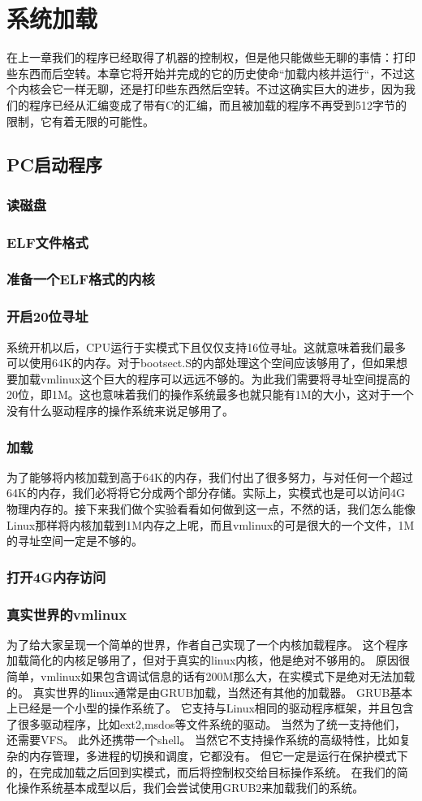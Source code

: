 \chapter{系统加载}

在上一章我们的程序已经取得了机器的控制权，但是他只能做些无聊的事情：打印些东西而后空转。本章它将开始并完成的它的历史使命“加载内核并运行“，不过这个内核会它一样无聊，还是打印些东西然后空转。不过这确实巨大的进步，因为我们的程序已经从汇编变成了带有C的汇编，而且被加载的程序不再受到512字节的限制，它有着无限的可能性。
\section{PC启动程序}
\subsection{读磁盘}
\subsection{ELF文件格式}
\subsection{准备一个ELF格式的内核}
\subsection{开启20位寻址}
系统开机以后，CPU运行于实模式下且仅仅支持16位寻址。这就意味着我们最多可以使用64K的内存。对于bootsect.S的内部处理这个空间应该够用了，但如果想要加载vmlinux这个巨大的程序可以远远不够的。为此我们需要将寻址空间提高的20位，即1M。这也意味着我们的操作系统最多也就只能有1M的大小，这对于一个没有什么驱动程序的操作系统来说足够用了。
\subsection{加载}
为了能够将内核加载到高于64K的内存，我们付出了很多努力，与对任何一个超过64K的内存，我们必将将它分成两个部分存储。实际上，实模式也是可以访问4G物理内存的。接下来我们做个实验看看如何做到这一点，不然的话，我们怎么能像Linux那样将内核加载到1M内存之上呢，而且vmlinux的可是很大的一个文件，1M的寻址空间一定是不够的。
\subsection{打开4G内存访问}
\subsection{真实世界的vmlinux}
为了给大家呈现一个简单的世界，作者自己实现了一个内核加载程序。
这个程序加载简化的内核足够用了，但对于真实的linux内核，他是绝对不够用的。
原因很简单，vmlinux如果包含调试信息的话有200M那么大，在实模式下是绝对无法加载的。
真实世界的linux通常是由GRUB加载，当然还有其他的加载器。
GRUB基本上已经是一个小型的操作系统了。
它支持与Linux相同的驱动程序框架，并且包含了很多驱动程序，比如ext2,msdos等文件系统的驱动。
当然为了统一支持他们，还需要VFS。
此外还携带一个shell。
当然它不支持操作系统的高级特性，比如复杂的内存管理，多进程的切换和调度，它都没有。
但它一定是运行在保护模式下的，在完成加载之后回到实模式，而后将控制权交给目标操作系统。
在我们的简化操作系统基本成型以后，我们会尝试使用GRUB2来加载我们的系统。
